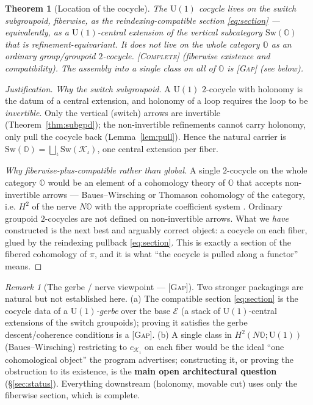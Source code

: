 \documentclass[11pt]{article}
\newtheorem{theorem}{Theorem}
\theoremstyle{definition}
\theoremstyle{remark}
\newtheorem*{remark}{Remark}
\newcommand{\K}{\mathcal K}
\newcommand{\Ecat}{\mathcal E}
\newcommand{\Oc}{\mathbb O}
\newcommand{\Sw}{\mathrm{Sw}}
\newcommand{\U}{\mathrm{U}}
\newcommand{\STC}{{\normalfont\textsc{[Complete]}}}
\newcommand{\STG}{{\normalfont\textsc{[Gap]}}}
\begin{document}
\begin{theorem}[Location of the cocycle]\label{thm:location}
The $\U(1)$ cocycle lives \emph{on the switch subgroupoid, fiberwise, as the
reindexing-compatible section \eqref{eq:section}} --- equivalently, as a $\U(1)$-central
extension of the vertical subcategory $\Sw(\Oc)$ that is refinement-equivariant. It does
\emph{not} live on the whole category $\Oc$ as an ordinary group/groupoid $2$-cocycle.
\STC{} (fiberwise existence and compatibility). The assembly into a single class on all
of $\Oc$ is \STG{} (see below).
\end{theorem}
\begin{proof}[Justification]
\emph{Why the switch subgroupoid.} A $\U(1)$ $2$-cocycle with holonomy is the datum of
a central extension, and holonomy of a loop requires the loop to be \emph{invertible}.
Only the vertical (switch) arrows are invertible (Theorem~\ref{thm:subgpd}); the
non-invertible refinements cannot carry holonomy, only pull the cocycle back
(Lemma~\ref{lem:pull}). Hence the natural carrier is $\Sw(\Oc)=\bigsqcup_\iota
\Sw(\K_\iota)$, one central extension per fiber.

\emph{Why fiberwise-plus-compatible rather than global.} A single $2$-cocycle on the
whole category $\Oc$ would be an element of a cohomology theory of $\Oc$ that accepts
non-invertible arrows --- Baues--Wirsching or Thomason cohomology of the category, i.e.
$H^2$ of the nerve $N\Oc$ with the appropriate coefficient system \cite{BauesWirsching,
Thomason}. Ordinary groupoid $2$-cocycles are not defined on non-invertible arrows.
What we \emph{have} constructed is the next best and arguably correct object: a cocycle
on each fiber, glued by the reindexing pullback \eqref{eq:section}. This is exactly a
section of the fibered cohomology of $\pi$, and it is what ``the cocycle is pulled along
a functor'' means. \end{proof}

\begin{remark}[The gerbe / nerve viewpoint --- \STG]\label{rem:gerbe}
Two stronger packagings are natural but not established here. (a) The compatible section
\eqref{eq:section} is the cocycle data of a \emph{$\U(1)$-gerbe} over the base $\Ecat$
(a stack of $\U(1)$-central extensions of the switch groupoids); proving it satisfies
the gerbe descent/coherence conditions is a \STG. (b) A single class in
$H^2(N\Oc;\U(1))$ (Baues--Wirsching) restricting to $c_{\K_\iota}$ on each fiber would
be the ideal ``one cohomological object'' the program advertises; constructing it, or
proving the obstruction to its existence, is the \textbf{main open architectural
question} (\S\ref{sec:status}). Everything downstream (holonomy, movable cut) uses only
the fiberwise section, which is complete.
\end{remark}
\end{document}
